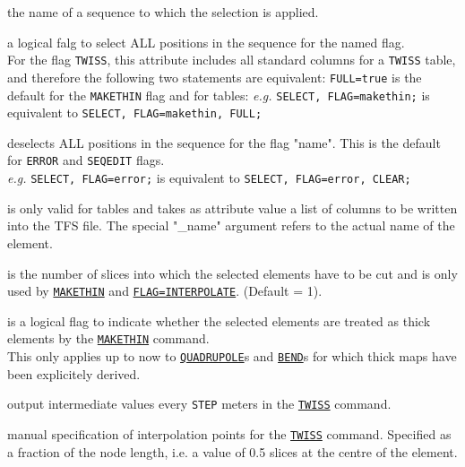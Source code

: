 \begin{madlist}
   the name of a sequence to which the selection is applied.

   a logical falg to select ALL positions in the sequence
  for the named flag. \\
  For the flag \texttt{TWISS}, this attribute includes all standard
  columns for a \texttt{TWISS} table, and therefore the following two
  statements are equivalent:
  \texttt{FULL=true} is the default for the \texttt{MAKETHIN} flag and
  for tables: \textsl{e.g.} \texttt{SELECT, FLAG=makethin;} is
  equivalent to \texttt{SELECT, FLAG=makethin, FULL;}   
  
   deselects ALL positions in the sequence for the flag
  "name". This is the default for \texttt{ERROR} and \texttt{SEQEDIT}
  flags. \\
  \textsl{e.g.} \texttt{SELECT, FLAG=error;} is equivalent to
  \texttt{SELECT, FLAG=error, CLEAR;} 

   is only valid for tables and takes as attribute value
  a list of columns to be written into the TFS file. The special "\_name"
  argument refers to the actual name of the element. 

   is the number of slices into which the selected
  elements have to be cut and is only used by
  \hyperref[chap:makethin]{\texttt{MAKETHIN}} and
  \hyperref[chap:twiss]{\texttt{FLAG=INTERPOLATE}}. (Default = 1).

   is a logical flag to indicate  whether the selected
  elements are treated as thick elements by the
  \hyperref[chap:makethin]{\texttt{MAKETHIN}} command. \\  
  This only applies up to now to
  \hyperref[sec:quadrupole]{\texttt{QUADRUPOLE}}s and
  \hyperref[sec:bend]{\texttt{BEND}}s for which thick maps
  have been explicitely derived. 

   output intermediate values every \texttt{STEP} meters
  in the \hyperref[chap:twiss]{\texttt{TWISS}} command.

   manual specification of interpolation points for the
  \hyperref[chap:twiss]{\texttt{TWISS}} command. Specified as a
  fraction of the node length, i.e. a value of 0.5 slices at
  the centre of the element.
\end{madlist}


